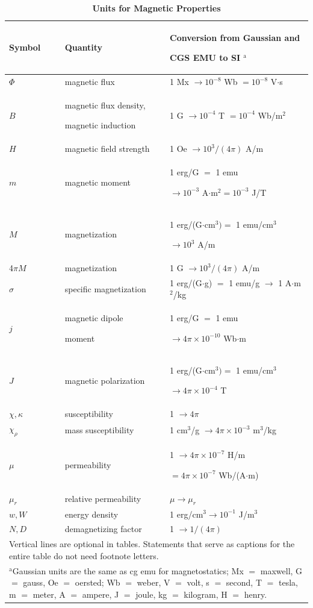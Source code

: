 \documentclass{ieeeaccess}
\begin{document}
\begin{table}
\caption{\textbf{Units for Magnetic Properties}}
\label{table}
\setlength{\tabcolsep}{3pt}
\begin{tabular}{|p{25pt}|p{75pt}|p{115pt}|}
\hline
Symbol&
Quantity&
Conversion from Gaussian and \par CGS EMU to SI $^{\mathrm{a}}$ \\
\hline
$\Phi $&
magnetic flux&
1 Mx $\to  10^{-8}$ Wb $= 10^{-8}$ V$\cdot $s \\
$B$&
magnetic flux density, \par magnetic induction&
1 G $\to  10^{-4}$ T $= 10^{-4}$ Wb/m$^{2}$ \\
$H$&
magnetic field strength&
1 Oe $\to  10^{3}/(4\pi )$ A/m \\
$m$&
magnetic moment&
1 erg/G $=$ 1 emu \par $\to 10^{-3}$ A$\cdot $m$^{2} = 10^{-3}$ J/T \\
$M$&
magnetization&
1 erg/(G$\cdot $cm$^{3}) =$ 1 emu/cm$^{3}$ \par $\to 10^{3}$ A/m \\
4$\pi M$&
magnetization&
1 G $\to  10^{3}/(4\pi )$ A/m \\
$\sigma $&
specific magnetization&
1 erg/(G$\cdot $g) $=$ 1 emu/g $\to $ 1 A$\cdot $m$^{2}$/kg \\
$j$&
magnetic dipole \par moment&
1 erg/G $=$ 1 emu \par $\to 4\pi \times  10^{-10}$ Wb$\cdot $m \\
$J$&
magnetic polarization&
1 erg/(G$\cdot $cm$^{3}) =$ 1 emu/cm$^{3}$ \par $\to 4\pi \times  10^{-4}$ T \\
$\chi , \kappa $&
susceptibility&
1 $\to  4\pi $ \\
$\chi_{\rho }$&
mass susceptibility&
1 cm$^{3}$/g $\to  4\pi \times  10^{-3}$ m$^{3}$/kg \\
$\mu $&
permeability&
1 $\to  4\pi \times  10^{-7}$ H/m \par $= 4\pi \times  10^{-7}$ Wb/(A$\cdot $m) \\
$\mu_{r}$&
relative permeability&
$\mu \to \mu_{r}$ \\
$w, W$&
energy density&
1 erg/cm$^{3} \to  10^{-1}$ J/m$^{3}$ \\
$N, D$&
demagnetizing factor&
1 $\to  1/(4\pi )$ \\
\hline
\multicolumn{3}{p{251pt}}{Vertical lines are optional in tables. Statements that serve as captions for
the entire table do not need footnote letters. }\\
\multicolumn{3}{p{251pt}}{$^{\mathrm{a}}$Gaussian units are the same as cg emu for magnetostatics; Mx
$=$ maxwell, G $=$ gauss, Oe $=$ oersted; Wb $=$ weber, V $=$ volt, s $=$
second, T $=$ tesla, m $=$ meter, A $=$ ampere, J $=$ joule, kg $=$
kilogram, H $=$ henry.}
\end{tabular}
\label{tab1}
\end{table}
\end{document}
